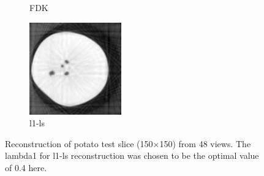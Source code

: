 \documentclass{article}
\begin{document}
\begin{figure}[!h]
\begin{subfigure}[b]{0.3\linewidth}
        \caption{FDK}
    \end{subfigure}
    \begin{subfigure}[b]{0.3\linewidth}
        \includegraphics[width=\textwidth]{../images/potato/2D/cs_blurred_results/48_views/result_CS_lambda0_0.40.png}
        \caption{l1-ls}
    \end{subfigure}
     \caption{Reconstruction of potato test slice (150$\times$150) from 48 views. The lambda1 for l1-ls reconstruction was chosen to be the optimal value of 0.4 here.} 
\label{fig:cs_blurred_48_views}
\end{figure}
\end{document}

